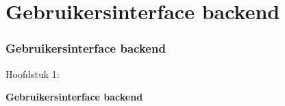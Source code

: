 %

\section{Gebruikersinterface backend}
\begin{frame}[fragile]
	\frametitle{Gebruikersinterface backend}

	\begin{center}\huge{Hoofdstuk 1:}\end{center}
	\begin{center}\huge{\color{typo3darkgrey}\textbf{Gebruikersinterface backend}}\end{center}

\end{frame}

